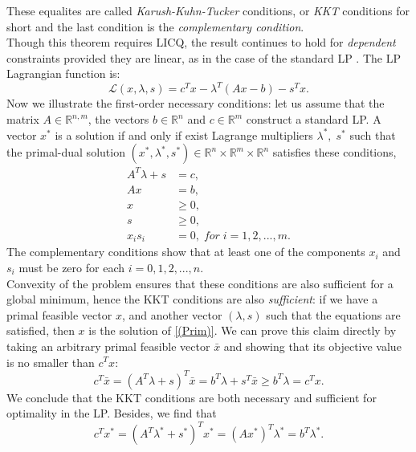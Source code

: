 \documentclass[a4paper,10 pt,titlepage,twoside]{book}
\theoremstyle{plain}
\theoremstyle{definition}
\theoremstyle{remark}
\begin{document}
These equalites are called \textit{Karush-Kuhn-Tucker} conditions, or \textit{KKT} conditions for short and the last condition is the \textit{complementary condition}.\\ Though this theorem requires LICQ, the result continues to hold for \textit{dependent} constraints provided they are linear, as in the case of the standard LP \cite{W}. The LP Lagrangian function is:\\
\begin{equation}
\mathcal{L}(x,\lambda,s)=c^{T}x-\lambda^{T}\left(Ax-b\right)-s^{T}x.
\end{equation}
Now we illustrate the first-order necessary conditions: let us assume that the matrix $A\in\mathbb{R}^{n,m}$, the vectors $b\in\mathbb{R}^{n}$ and $c\in\mathbb{R}^{m}$ construct a standard LP. A vector $x^{*}$ is a solution if and only if exist Lagrange multipliers $\lambda^{*},\;s^{*}$ such that the primal-dual solution $\left( x^{*},\lambda^{*},s^{*}\right)\in\mathbb{R}^{n}\times\mathbb{R}^{m}\times\mathbb{R}^{n}$ satisfies these conditions, 
\begin{align}
A^{T}\lambda+s&=c,\\ \label{DF}
Ax&=b,\\ \label{PF}
x&\geq 0,\\
s&\geq 0,\\
x_{i}s_{i}&=0,\; for\;i= 1,2,...,m. \label{CC}
\end{align} 
The complementary conditions show that at least one of the components $x_{i}$ and $s_{i}$ must be zero for each $i=0,1,2,...,n$.\\
 Convexity of the problem ensures that these conditions are also sufficient for a global minimum, hence the KKT conditions are also \textit{sufficient}: if we have a primal feasible vector $x$, and another vector $(\lambda, s)$ such that the equations are satisfied, then $x$ is the solution of \ref{(Prim)}. We can prove this claim directly by taking an arbitrary primal feasible vector $\bar{x}$ and showing that its objective value is no smaller than $c^{T}x$:
\begin{equation*}
c^{T}\bar{x}=(A^{T}\lambda+s)^{T}\bar{x}=b^{T}\lambda+s^{T}\bar{x}\geq b^{T}\lambda= c^{T}x.
\end{equation*}
We conclude that the KKT conditions are both necessary and sufficient for optimality in the LP. Besides, we find that
\begin{equation*}
	c^{T}x^{*}=\left(A^{T}\lambda^{*}+s^{*}\right)^{T}x^{*}=\left(Ax^{*}\right)^{T}\lambda^{*}=b^{T}\lambda^{*}.
\end{equation*}
\end{document}
